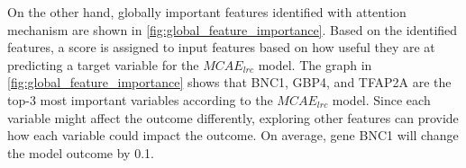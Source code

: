 \hspace*{3.5mm} On the other hand, globally important features identified with attention mechanism are shown in \cref{fig:global_feature_importance}. Based on the identified features, a score is assigned to input features based on how useful they are at predicting a target variable for the $MCAE_{lrc}$ model. The graph in \cref{fig:global_feature_importance} shows that BNC1, GBP4, and TFAP2A are the top-3 most important variables according to the $MCAE_{lrc}$ model. Since each variable might affect the outcome differently, exploring other features can provide how each variable could impact the outcome. On average, gene BNC1 will change the model outcome by 0.1. 


